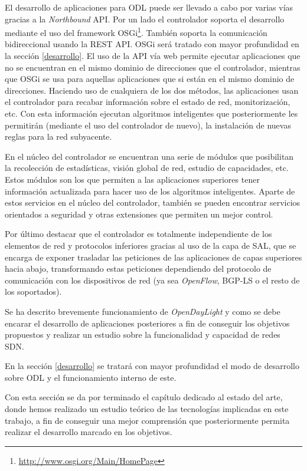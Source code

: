 \documentclass[a4paper,11pt]{book}
\begin{document}
El desarrollo de aplicaciones para \ac{ODL} puede ser llevado a cabo por varias vías gracias a la \textit{Northbound} \ac{API}. Por un lado el controlador soporta el desarrollo mediante el uso del framework \ac{OSGi}\footnote{\url{http://www.osgi.org/Main/HomePage}}. También soporta la comunicación bidireccional usando la \ac{REST} \ac{API}. OSGi será tratado con mayor profundidad en la sección \ref{desarrollo}. El uso de la \ac{API} vía web permite ejecutar aplicaciones que no se encuentran en el mismo dominio de direcciones que el controlador, mientras que \ac{OSGi} se usa para aquellas aplicaciones que si están en el mismo dominio de direcciones. Haciendo uso de cualquiera de los dos métodos, las aplicaciones usan el controlador para recabar información sobre el estado de red, monitorización, etc. Con esta información ejecutan algoritmos inteligentes que posteriormente les permitirán (mediante el uso del controlador de nuevo), la instalación de nuevas reglas para la red subyacente.

En el núcleo del controlador se encuentran una serie de módulos que posibilitan la recolección de estadísticas, visión global de red, estudio de capacidades, etc. Estos módulos son los que permiten a las aplicaciones superiores tener información actualizada para hacer uso de los algoritmos inteligentes. Aparte de estos servicios en el núcleo del controlador, también se pueden encontrar servicios orientados a seguridad y otras extensiones que permiten un mejor control.

Por último destacar que el controlador es totalmente independiente de los elementos de red y protocolos inferiores gracias al uso de la capa de \ac{SAL}, que se encarga de exponer trasladar las peticiones de las aplicaciones de capas superiores hacia abajo, transformando estas peticiones dependiendo del protocolo de comunicación con los dispositivos de red (ya sea \emph{OpenFlow}, BGP-LS o el resto de los soportados).

Se ha descrito brevemente funcionamiento de \emph{OpenDayLight} y como se debe encarar el desarrollo de aplicaciones posteriores a fin de conseguir los objetivos propuestos y realizar un estudio sobre la funcionalidad y capacidad de redes SDN.

En la sección \ref{desarrollo} se tratará con mayor profundidad el modo de desarrollo sobre \ac{ODL} y el funcionamiento interno de este. 

Con esta sección se da por terminado el capítulo dedicado al estado del arte, donde hemos realizado un estudio teórico de las tecnologías implicadas en este trabajo, a fin de conseguir una mejor comprensión que posteriormente permita realizar el desarrollo marcado en los objetivos.
\end{document}
